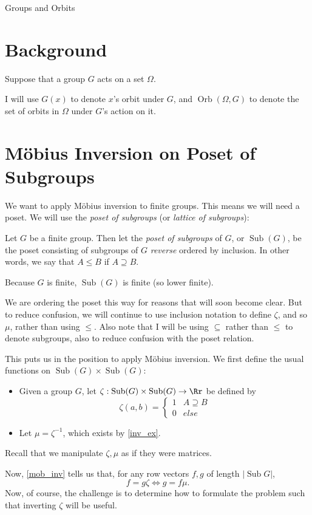 \documentclass[12pt]{pom_thesis}
\DeclareMathOperator{\sub}{Sub}
\DeclareMathOperator{\orb}{Orb}
\begin{document}
\begin{chapter}{Groups and Orbits} 
\section{Background}
Suppose that a group $G$ acts on a set $\Omega$. 

I will use $G(x)$ to denote $x$'s orbit under $G$, and $\orb(\Omega, G)$ to denote the set of orbits in $\Omega$ under $G$'s action on it. 
\section{M\"obius Inversion on Poset of Subgroups}
We want to apply M\"obius inversion to finite groups. This means we will need a poset. We will use the \emph{poset of subgroups} (or \emph{lattice of subgroups}):
\begin{defn}
Let $G$ be a finite group. Then let the \textit{poset of subgroups} of $G$, or $\sub(G)$, be the poset consisting of subgroups of $G$ \emph{reverse} ordered by inclusion. In other words, we say that $A \leq B$ if $A \supseteq B$.
\end{defn}
\begin{rmk}
Because $G$ is finite, $\sub(G)$ is finite (so lower finite).
\end{rmk}
\begin{rmk}
We are ordering the poset this way for reasons that will soon become clear. But to reduce confusion, we will continue to use inclusion notation to define $\zeta$, and so $\mu$, rather than using $\leq$. Also note that I will be using $\subseteq$ rather than $\leq$ to denote subgroups, also to reduce confusion with the poset relation.
\end{rmk}
This puts us in the position to apply M\"obius inversion. We first define the usual functions on $\sub(G) \times \sub(G)$:
\begin{itemize}
\item Given a group $G$, let $\zeta:\sub(G) \times \sub(G) \rightarrow \Rr$ be defined by
\[
\zeta(a,b) = \begin{cases}
1 & A \supseteq B\\
0 & else
\end{cases}
\]
\item Let $\mu = \zeta^{-1}$, which exists by \ref{inv_ex}.
\end{itemize}
Recall that we manipulate $\zeta, \mu$ as if they were matrices.

Now, \ref{mob_inv} tells us that, for any row vectors $f,g$ of length $|\sub{G}|$, 
\[
f = g\zeta \iff g = f\mu.
\]
Now, of course, the challenge is to determine how to formulate the problem such that inverting $\zeta$ will be useful.

\end{chapter}
\end{document}
